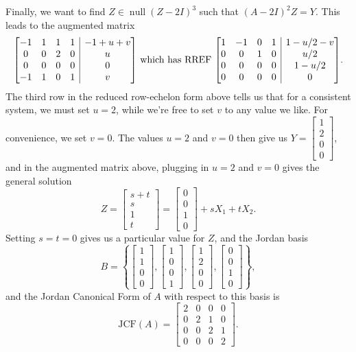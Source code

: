 \documentclass[letterpaper,12pt]{article}
\makeatletter
\DeclareMathOperator{\nul}{null}
\newenvironment{amatrix}[1]{%
  \left[\begin{array}{@{}*{#1}{c}|c@{}}
}{%
  \end{array}\right]
}
\makeatother
\begin{document}
Finally, we want to find $Z\in\nul(Z-2I)^3$ such that $(A-2I)^2Z=Y$. This leads to the augmented matrix
\[
 \begin{amatrix}{4}
  -1&1&1&1&-1+u+v\\
  0&0&2&0&u\\
  0&0&0&0&0\\
  -1&1&0&1&v
 \end{amatrix} \text{ which has RREF }
\begin{amatrix}{4}
 1&-1&0&1&1-u/2-v\\
 0&0&1&0&u/2\\
0&0&0&0&1-u/2\\
0&0&0&0&0
\end{amatrix}.
\]
The third row in the reduced row-echelon form above tells us that for a consistent system, we must set $u=2$, while we're free to set $v$ to any value we like. For convenience, we set $v=0$. The values $u=2$ and $v=0$ then give us $Y=\begin{bmatrix}1\\2\\0\\0\end{bmatrix}$, and in the augmented matrix above, plugging in $u=2$ and $v=0$ gives the general solution
\[
 Z = \begin{bmatrix}s+t\\s\\1\\t\end{bmatrix} = \begin{bmatrix}0\\0\\1\\0\end{bmatrix}+sX_1+tX_2.
\]
Setting $s=t=0$ gives us a particular value for $Z$, and the Jordan basis
\[
 B = \left\{\begin{bmatrix}1\\1\\0\\0\end{bmatrix},\begin{bmatrix}1\\0\\0\\1\end{bmatrix},\begin{bmatrix}1\\2\\0\\0\end{bmatrix},\begin{bmatrix}0\\0\\1\\0\end{bmatrix}\right\},
\]
and the Jordan Canonical Form of $A$ with respect to this basis is
\[
 \mathrm{JCF}(A) = \begin{bmatrix}
                    2&0&0&0\\0&2&1&0\\0&0&2&1\\0&0&0&2
                   \end{bmatrix}.
\]
\end{document}

